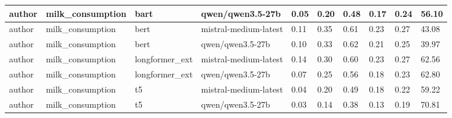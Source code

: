 \begin{tabular}{|l|l|l|l|l|l|l|l|l|l|}
 \hline
 author & milk\_consumption & bart & qwen/qwen3.5-27b & 0.05 & 0.20 & 0.48 & 0.17 & 0.24 & 56.10 \\
 \hline
 author & milk\_consumption & bert & mistral-medium-latest & 0.11 & 0.35 & 0.61 & 0.23 & 0.27 & 43.08 \\
 \hline
 author & milk\_consumption & bert & qwen/qwen3.5-27b & 0.10 & 0.33 & 0.62 & 0.21 & 0.25 & 39.97 \\
 \hline
 author & milk\_consumption & longformer\_ext & mistral-medium-latest & 0.14 & 0.30 & 0.60 & 0.23 & 0.27 & 62.56 \\
 \hline
 author & milk\_consumption & longformer\_ext & qwen/qwen3.5-27b & 0.07 & 0.25 & 0.56 & 0.18 & 0.23 & 62.80 \\
 \hline
 author & milk\_consumption & t5 & mistral-medium-latest & 0.04 & 0.20 & 0.49 & 0.18 & 0.22 & 59.22 \\
 \hline
 author & milk\_consumption & t5 & qwen/qwen3.5-27b & 0.03 & 0.14 & 0.38 & 0.13 & 0.19 & 70.81 \\
\hline
\end{tabular}
